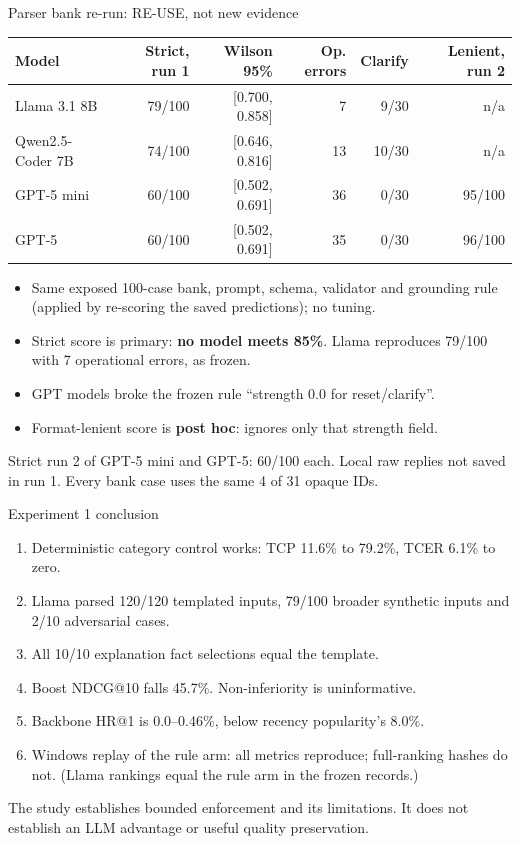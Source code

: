 \documentclass[10pt]{beamer}
\newcommand{\toprule}{\hline}
\newcommand{\midrule}{\hline}
\newcommand{\bottomrule}{\hline}
\newcommand{\src}[1]{\vfill{\tiny\color{bcitgray}#1}}
\begin{document}
\begin{frame}{Parser bank re-run: RE-USE, not new evidence}
\footnotesize
\setlength{\tabcolsep}{3pt}
\begin{tabular}{@{}lrrrrr@{}}
\toprule
Model & Strict, run 1 & Wilson 95\% & Op. errors & Clarify & Lenient, run 2\\\midrule
Llama 3.1 8B & 79/100 & [0.700, 0.858] & 7 & 9/30 & n/a\\
Qwen2.5-Coder 7B & 74/100 & [0.646, 0.816] & 13 & 10/30 & n/a\\
GPT-5 mini & 60/100 & [0.502, 0.691] & 36 & 0/30 & 95/100\\
GPT-5 & 60/100 & [0.502, 0.691] & 35 & 0/30 & 96/100\\\bottomrule
\end{tabular}\par
\vspace{0.25cm}
\begin{itemize}
\item Same exposed 100-case bank, prompt, schema, validator and grounding rule (applied by re-scoring the saved predictions); no tuning.
\item Strict score is primary: \textbf{no model meets 85\%}. Llama reproduces 79/100 with 7 operational errors, as frozen.
\item GPT models broke the frozen rule ``strength 0.0 for reset/clarify''.
\item Format-lenient score is \textbf{post hoc}: ignores only that strength field.
\end{itemize}
\src{Strict run 2 of GPT-5 mini and GPT-5: 60/100 each. Local raw replies not saved in run 1. Every bank case uses the same 4 of 31 opaque IDs.}
\end{frame}

\begin{frame}{Experiment 1 conclusion}
\begin{enumerate}
\item Deterministic category control works: TCP 11.6\% to 79.2\%, TCER 6.1\% to zero.
\item Llama parsed 120/120 templated inputs, 79/100 broader synthetic inputs and 2/10 adversarial cases.
\item All 10/10 explanation fact selections equal the template.
\item Boost NDCG@10 falls 45.7\%. Non-inferiority is uninformative.
\item Backbone HR@1 is 0.0--0.46\%, below recency popularity's 8.0\%.
\item Windows replay of the rule arm: all metrics reproduce; full-ranking hashes do not. (Llama rankings equal the rule arm in the frozen records.)
\end{enumerate}
\src{The study establishes bounded enforcement and its limitations. It does not establish an LLM advantage or useful quality preservation.}
\end{frame}
\end{document}
